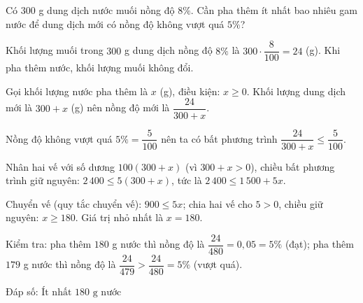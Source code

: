\begin{problem}[9DS-BPT-049]
Có $300$ g dung dịch nước muối nồng độ $8\%$. Cần pha thêm ít nhất bao nhiêu gam nước để dung dịch mới có nồng độ không vượt quá $5\%$?

\begin{solution}
Khối lượng muối trong $300$ g dung dịch nồng độ $8\%$ là $300 \cdot \dfrac{8}{100} = 24$ (g). Khi pha thêm nước, khối lượng muối không đổi.

Gọi khối lượng nước pha thêm là $x$ (g), điều kiện: $x \geq 0$. Khối lượng dung dịch mới là $300 + x$ (g) nên nồng độ mới là $\dfrac{24}{300 + x}$.

Nồng độ không vượt quá $5\% = \dfrac{5}{100}$ nên ta có bất phương trình $\dfrac{24}{300 + x} \leq \dfrac{5}{100}$.

Nhân hai vế với số dương $100(300 + x)$ (vì $300 + x > 0$), chiều bất phương trình giữ nguyên: $2\,400 \leq 5(300 + x)$, tức là $2\,400 \leq 1\,500 + 5x$.

Chuyển vế (quy tắc chuyển vế): $900 \leq 5x$; chia hai vế cho $5 > 0$, chiều giữ nguyên: $x \geq 180$. Giá trị nhỏ nhất là $x = 180$.

Kiểm tra: pha thêm $180$ g nước thì nồng độ là $\dfrac{24}{480} = 0{,}05 = 5\%$ (đạt); pha thêm $179$ g nước thì nồng độ là $\dfrac{24}{479} > \dfrac{24}{480} = 5\%$ (vượt quá).

Đáp số: $\boxed{\text{Ít nhất } 180 \text{ g nước}}$
\end{solution}
\end{problem}

